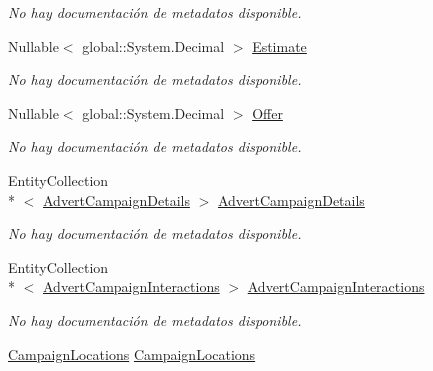 \begin{DoxyCompactItemize}
\begin{DoxyCompactList}\small\item\em No hay documentación de metadatos disponible. \end{DoxyCompactList}\item 
Nullable$<$ global\-::\-System.\-Decimal $>$ \hyperlink{class_game_memory_1_1_advert_campaigns_a7522ba2501af95ad0ca28b9ca1e3230a}{Estimate}
\begin{DoxyCompactList}\small\item\em No hay documentación de metadatos disponible. \end{DoxyCompactList}\item 
Nullable$<$ global\-::\-System.\-Decimal $>$ \hyperlink{class_game_memory_1_1_advert_campaigns_a9d2fcb82eb2b201a608017335a28567e}{Offer}
\begin{DoxyCompactList}\small\item\em No hay documentación de metadatos disponible. \end{DoxyCompactList}\item 
Entity\-Collection\\*
$<$ \hyperlink{class_game_memory_1_1_advert_campaign_details}{Advert\-Campaign\-Details} $>$ \hyperlink{class_game_memory_1_1_advert_campaigns_a6e7c57f8db8798bdbdddcaafa8e8cbae}{Advert\-Campaign\-Details}
\begin{DoxyCompactList}\small\item\em No hay documentación de metadatos disponible. \end{DoxyCompactList}\item 
Entity\-Collection\\*
$<$ \hyperlink{class_game_memory_1_1_advert_campaign_interactions}{Advert\-Campaign\-Interactions} $>$ \hyperlink{class_game_memory_1_1_advert_campaigns_af100fbf823e76ee9df9436ac59717435}{Advert\-Campaign\-Interactions}
\begin{DoxyCompactList}\small\item\em No hay documentación de metadatos disponible. \end{DoxyCompactList}\item 
\hyperlink{class_game_memory_1_1_campaign_locations}{Campaign\-Locations} \hyperlink{class_game_memory_1_1_advert_campaigns_ab28b02102aeef1788ca6e1dd3bb6a098}{Campaign\-Locations}

\end{DoxyCompactItemize}
